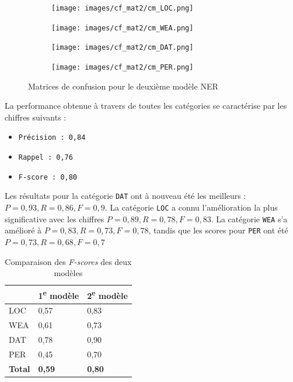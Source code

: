 \documentclass[a4paper,twoside,12pt]{article}
\begin{document}
\begin{figure}[h]
\centering
\begin{subfigure}
    \centering
    \texttt{[image: images/cf\_mat2/cm\_LOC.png]}
\end{subfigure}
\begin{subfigure}
    \centering
    \texttt{[image: images/cf\_mat2/cm\_WEA.png]}
\end{subfigure}

\begin{subfigure}
    \centering
    \texttt{[image: images/cf\_mat2/cm\_DAT.png]}
\end{subfigure}
\begin{subfigure}
    \centering
    \texttt{[image: images/cf\_mat2/cm\_PER.png]}
\end{subfigure}
\caption{Matrices de confusion pour le deuxième modèle NER}
\label{fig:conf_mat2}
\end{figure}

La performance obtenue à travers de toutes les catégories se caractérise par les chiffres suivants :
\vspace{1ex}
\begin{itemize}[label=$\bullet$]
    \item \texttt{Précision : 0,84}
    \item \texttt{Rappel : 0,76}
    \item \texttt{F-score : 0,80}
\end{itemize}
\vspace{2ex}

\clearpage

Les résultats pour la catégorie \texttt{DAT} ont à nouveau été les meilleurs : $P=0,93, R=0,86, F=0,9$. La catégorie \texttt{LOC} a connu l'amélioration la plus significative avec les chiffres $P=0,89, R=0,78, F=0,83$. La catégorie \texttt{WEA} s'a amélioré à $P=0,83, R=0,73, F=0,78$, tandis que les scores pour \texttt{PER} ont été $P=0,73, R=0,68, F=0,7$

\begin{table}[h]
    \centering
    \begin{tabular}{l|l|l|}
         & 1\textsuperscript{e} modèle & 2\textsuperscript{e} modèle\\
         \hline
         LOC & 0,57 & 0,83\\
         WEA & 0,61 & 0,73\\
         DAT & 0,78 & 0,90\\
         PER & 0,45 & 0,70\\
         \textbf{Total} & \textbf{0,59} & \textbf{0,80}
    \end{tabular}
    \caption{Comparaison des \textit{F-scores} des deux modèles}
    \label{tab:f_scores}
\end{table}
\end{document}
